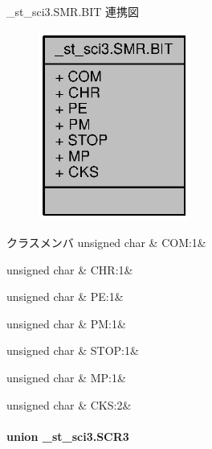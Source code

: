 \+\_\+st\+\_\+sci3.\+S\+M\+R.\+B\+I\+T 連携図
\nopagebreak
\begin{figure}[H]
\begin{center}
\leavevmode
\includegraphics[width=141pt]{de/dc9/struct__st__sci3_8SMR_8BIT__coll__graph}
\end{center}
\end{figure}
\begin{DoxyFields}{クラスメンバ}
unsigned char\label{3694s_8h_ad47c174ed277bdf06cfc72763ab7970c}
&
C\+O\+M\+:1&
\\
\hline

unsigned char\label{3694s_8h_af842e3bace9c0c18c5b23a56932090a7}
&
C\+H\+R\+:1&
\\
\hline

unsigned char\label{3694s_8h_a3acf83834396fa1c878707132ead62b8}
&
P\+E\+:1&
\\
\hline

unsigned char\label{3694s_8h_a21b7eb30013b04776f5b06bc59209391}
&
P\+M\+:1&
\\
\hline

unsigned char\label{3694s_8h_a615a46af313786fc4e349f34118be111}
&
S\+T\+O\+P\+:1&
\\
\hline

unsigned char\label{3694s_8h_ac90a918b859bd1e56cf99af6246b128e}
&
M\+P\+:1&
\\
\hline

unsigned char\label{3694s_8h_a62e08e3df930b3022644f9943263a758}
&
C\+K\+S\+:2&
\\
\hline

\end{DoxyFields}
\label{union__st__sci3_8SCR3}
\paragraph{union \+\_\+st\+\_\+sci3.\+S\+C\+R3}


